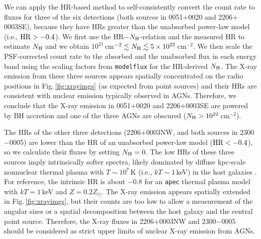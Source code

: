 \documentclass[iop,revtex4,twocolumn,apj,numberedappendix,appendixfloats]{emulateapj}
\begin{document}
We can apply the HR-based method to self-consistently convert the count rate to fluxes for three of the six detections (both sources in 0051$+$0020 and 2206$+$0003SE), because they have HRs greater than the unabsorbed power-law model (i.e., ${\rm HR} > -0.4$). We first use the HR$-$$N_{\rm H}$-relation and the measured HR to estimate $N_{\rm H}$ and we obtain $10^{21}$\,cm$^{-2} \lesssim N_{\rm H} \lesssim 5\times10^{22}$\,cm$^{-2}$. We then scale the PSF-corrected count rate to the absorbed and the unabsorbed flux in each energy band using the scaling factors from \texttt{modelflux} for the HR-derived $N_{\rm H}$. The X-ray emission from these three sources appears spatially concentrated on the radio positions in Fig.\,\ref{fig:xrayimgs} (as expected from point sources) and their HRs are consistent with nuclear emission typically observed in AGNs. Therefore, we conclude that the X-ray emission in 0051$+$0020 and 2206$+$0003SE are powered by BH accretion and one of the three AGNs are obscured ($N_{\rm H} > 10^{22}$\,cm$^{-2}$).

The HRs of the other three detections (2206$+$0003NW, and both sources in 2300$-$0005) are lower than the HR of an unabsorbed power-law model (${\rm HR} < -0.4$), so we calculate their fluxes by setting $N_{\rm H} = 0$. The low HRs of these three sources imply intrinsically softer spectra, likely dominated by diffuse kpc-scale nonnuclear thermal plasma with $T \sim 10^7$\,K (i.e., $kT \sim 1$\,keV) in the host galaxies \citep[e.g.,][]{Donato04}. For reference, the intrinsic HR is about $-0.8$ for an \texttt{apec} thermal plasma model with $kT = 1$\,keV and $Z = 0.2 Z_\odot$. The X-ray emission appears spatially extended in Fig.\,\ref{fig:xrayimgs}, but their counts are too low to allow a measurement of the angular sizes or a spatial decomposition between the host galaxy and the central point source. Therefore, the X-ray fluxes in 2206$+$0003NW and 2300$-$0005 should be considered as strict upper limits of nuclear X-ray emission from AGNs.
\end{document}
